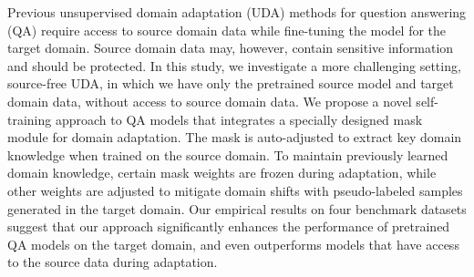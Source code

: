 Previous unsupervised domain adaptation (UDA) methods for question answering (QA) require access to source domain data while fine-tuning the model for the target domain. Source domain data may, however, contain sensitive information and should be protected. In this study, we investigate a more challenging setting, source-free UDA, in which we have only the pretrained source model and target domain data, without access to source domain data. We propose a novel self-training approach to QA models that integrates a specially designed mask module for domain adaptation. The mask is auto-adjusted to extract key domain knowledge when trained on the source domain. To maintain previously learned domain knowledge, certain mask weights are frozen during adaptation, while other weights are adjusted to mitigate domain shifts with pseudo-labeled samples generated in the target domain. Our empirical results on four benchmark datasets suggest that our approach significantly enhances the performance of pretrained QA models on the target domain, and even outperforms models that have access to the source data during adaptation.